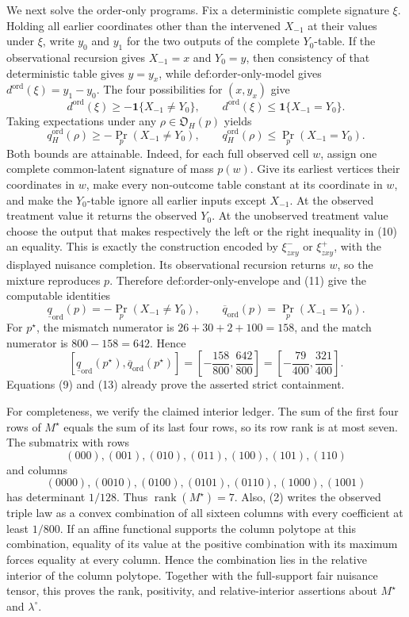 We next solve the order-only programs.  Fix a deterministic complete signature \(\xi\).  Holding all earlier coordinates other than the intervened \(X_{-1}\) at their values under \(\xi\), write \(y_0\) and \(y_1\) for the two outputs of the complete \(Y_0\)-table.  If the observational recursion gives \(X_{-1}=x\) and \(Y_0=y\), then consistency of that deterministic table gives \(y=y_x\), while \(\text{def:order-only-model}\) gives \(d^{\mathrm{ord}}(\xi)=y_1-y_0\).  The four possibilities for \((x,y_x)\) give
\[
d^{\mathrm{ord}}(\xi)\ge-\mathbf 1\{X_{-1}\ne Y_0\},
\qquad
d^{\mathrm{ord}}(\xi)\le\mathbf 1\{X_{-1}=Y_0\}.
\tag{10}
\]
Taking expectations under any \(\rho\in\mathfrak O_H(p)\) yields
\[
q_H^{\mathrm{ord}}(\rho)\ge-\Pr_p(X_{-1}\ne Y_0),
\qquad
q_H^{\mathrm{ord}}(\rho)\le\Pr_p(X_{-1}=Y_0).
\tag{11}
\]
Both bounds are attainable.  Indeed, for each full observed cell \(w\), assign one complete common-latent signature of mass \(p(w)\).  Give its earliest vertices their coordinates in \(w\), make every non-outcome table constant at its coordinate in \(w\), and make the \(Y_0\)-table ignore all earlier inputs except \(X_{-1}\).  At the observed treatment value it returns the observed \(Y_0\).  At the unobserved treatment value choose the output that makes respectively the left or the right inequality in (10) an equality.  This is exactly the construction encoded by \(\xi_{zxy}^-\) or \(\xi_{zxy}^+\), with the displayed nuisance completion.  Its observational recursion returns \(w\), so the mixture reproduces \(p\).  Therefore \(\text{def:order-only-envelope}\) and (11) give the computable identities
\[
\underline q_{\mathrm{ord}}(p)=-\Pr_p(X_{-1}\ne Y_0),
\qquad
\overline q_{\mathrm{ord}}(p)=\Pr_p(X_{-1}=Y_0).
\tag{12}
\]
For \(p^{\star}\), the mismatch numerator is \(26+30+2+100=158\), and the match numerator is \(800-158=642\).  Hence
\[
[\underline q_{\mathrm{ord}}(p^{\star}),\overline q_{\mathrm{ord}}(p^{\star})]
=\left[-\frac{158}{800},\frac{642}{800}\right]
=\left[-\frac{79}{400},\frac{321}{400}\right].
\tag{13}
\]
Equations (9) and (13) already prove the asserted strict containment.

For completeness, we verify the claimed interior ledger.  The sum of the first four rows of \(M^{\star}\) equals the sum of its last four rows, so its row rank is at most seven.  The submatrix with rows
\[
(000),(001),(010),(011),(100),(101),(110)
\]
and columns
\[
(0000),(0010),(0100),(0101),(0110),(1000),(1001)
\]
has determinant \(1/128\).  Thus \(\operatorname{rank}(M^{\star})=7\).  Also, (2) writes the observed triple law as a convex combination of all sixteen columns with every coefficient at least \(1/800\).  If an affine functional supports the column polytope at this combination, equality of its value at the positive combination with its maximum forces equality at every column.  Hence the combination lies in the relative interior of the column polytope.  Together with the full-support fair nuisance tensor, this proves the rank, positivity, and relative-interior assertions about \(M^{\star}\) and \(\lambda^{\circ}\).

